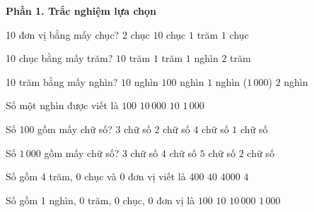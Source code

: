 \textbf{Phần 1. Trắc nghiệm lựa chọn}

\begin{ex} %
10 đơn vị bằng mấy chục?
\choice
{$2$ chục}
{$10$ chục}
{$1$ trăm}
{\True $1$ chục}
\end{ex}

\begin{ex} %
10 chục bằng mấy trăm?
\choice
{$10$ trăm}
{\True $1$ trăm}
{$1$ nghìn}
{$2$ trăm}
\end{ex}

\begin{ex} %
10 trăm bằng mấy nghìn?
\choice
{$10$ nghìn}
{$100$ nghìn}
{\True $1$ nghìn ($1\,000$)}
{$2$ nghìn}
\end{ex}

\begin{ex} %
Số một nghìn được viết là
\choice
{$100$}
{$10\,000$}
{$10$}
{\True $1\,000$}
\end{ex}

\begin{ex} %
Số 100 gồm mấy chữ số?
\choice
{\True $3$ chữ số}
{$2$ chữ số}
{$4$ chữ số}
{$1$ chữ số}
\end{ex}

\begin{ex} %
Số $1\,000$ gồm mấy chữ số?
\choice
{$3$ chữ số}
{\True $4$ chữ số}
{$5$ chữ số}
{$2$ chữ số}
\end{ex}

\begin{ex} %
Số gồm 4 trăm, 0 chục và 0 đơn vị viết là
\choice
{\True $400$}
{$40$}
{$4000$}
{$4$}
\end{ex}

\begin{ex} %
Số gồm 1 nghìn, 0 trăm, 0 chục, 0 đơn vị là
\choice
{$100$}
{$10$}
{$10\,000$}
{\True $1\,000$}
\end{ex}

